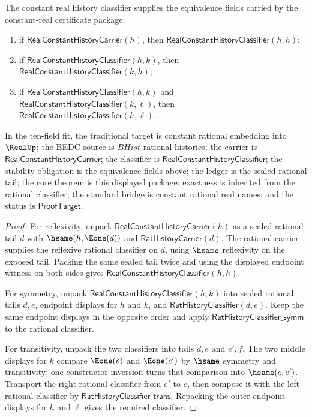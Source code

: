 \begin{theorem}
\label{thm:real-constant-history-classifier-equivalence-fields}
The constant real history classifier supplies the equivalence fields carried by
the constant-real certificate package:
\begin{enumerate}
  \item if $\mathsf{RealConstantHistoryCarrier}(h)$, then
  $\mathsf{RealConstantHistoryClassifier}(h,h)$;
  \item if $\mathsf{RealConstantHistoryClassifier}(h,k)$, then
  $\mathsf{RealConstantHistoryClassifier}(k,h)$;
  \item if $\mathsf{RealConstantHistoryClassifier}(h,k)$ and
  $\mathsf{RealConstantHistoryClassifier}(k,\ell)$, then
  $\mathsf{RealConstantHistoryClassifier}(h,\ell)$.
\end{enumerate}
In the ten-field fit, the traditional target is constant rational embedding
into $\RealUp$; the BEDC source is $BHist$ rational histories; the carrier is
$\mathsf{RealConstantHistoryCarrier}$; the classifier is
$\mathsf{RealConstantHistoryClassifier}$; the stability obligation is the
equivalence fields above; the ledger is the sealed rational tail; the core
theorem is this displayed package; exactness is inherited from the rational
classifier; the standard bridge is constant rational real names; and the status
is $\mathsf{ProofTarget}$.
\end{theorem}
\begin{proof}
For reflexivity, unpack $\mathsf{RealConstantHistoryCarrier}(h)$ as a sealed
rational tail $d$ with $\hsame(h,\Eone(d))$ and
$\mathsf{RatHistoryCarrier}(d)$. The rational carrier supplies the reflexive
rational classifier on $d$, using $\hsame$ reflexivity on the exposed tail.
Packing the same sealed tail twice and using the displayed endpoint witness on
both sides gives $\mathsf{RealConstantHistoryClassifier}(h,h)$.

For symmetry, unpack
$\mathsf{RealConstantHistoryClassifier}(h,k)$ into sealed rational tails $d,e$,
endpoint displays for $h$ and $k$, and
$\mathsf{RatHistoryClassifier}(d,e)$. Keep the same endpoint displays in the
opposite order and apply $\mathsf{RatHistoryClassifier\_symm}$ to the rational
classifier.

For transitivity, unpack the two classifiers into tails $d,e$ and $e',f$. The
two middle displays for $k$ compare $\Eone(e)$ and $\Eone(e')$ by $\hsame$
symmetry and transitivity; one-constructor inversion turns that comparison into
$\hsame(e,e')$. Transport the right rational classifier from $e'$ to $e$, then
compose it with the left rational classifier by
$\mathsf{RatHistoryClassifier\_trans}$. Repacking the outer endpoint displays
for $h$ and $\ell$ gives the required classifier.
\end{proof}

